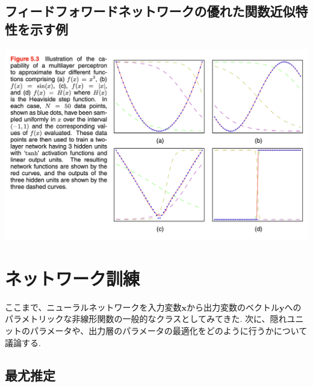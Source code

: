 \documentclass[11pt,a4paper]{jsarticle}
\begin{document}
\subsection{フィードフォワードネットワークの優れた関数近似特性を示す例}
\includegraphics[scale=0.4]{example.png}
\newpage
\section{ネットワーク訓練}
ここまで、ニューラルネットワークを入力変数$\textbf{x}から出力変数のベクトル\textbf{y}$へのパラメトリックな非線形関数の一般的なクラスとしてみてきた. 次に、隠れユニットのパラメータや、出力層のパラメータの最適化をどのように行うかについて議論する.
\subsection{最尤推定}
\end{document}
